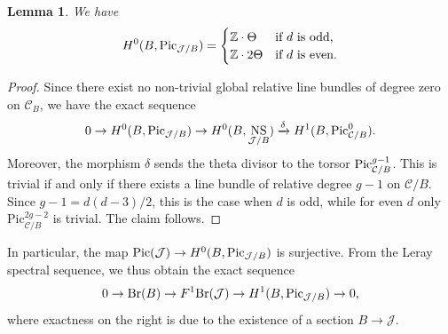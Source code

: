 \documentclass[11pt]{amsart}
\theoremstyle{plain}
\newtheorem{lem}[thm]{Lemma}
\theoremstyle{definition}
\theoremstyle{remark}
\DeclareMathOperator{\Br}{Br}
\newcommand{\Pic}{\mathop{\rm Pic}\nolimits}
\DeclareMathOperator{\NS}{NS}
\begin{document}
\begin{lem}\label{lem: desc picJ}
We have
$$H^0(B, \Pic_{\mathcal{J}/B}) = \begin{cases}
    \mathbb Z \cdot \Theta & \text{if } d \text{ is odd,} \\
    \mathbb Z \cdot 2 \Theta & \text{if } d \text{ is even}.
\end{cases}$$
\end{lem}
\begin{proof}
    Since there exist no non-trivial global relative line bundles of degree zero on $\mathcal C_B$, we have the exact sequence
    $$0 \to H^0(B, \Pic_{\mathcal{J}/B}) \to H^0(B,\NS_{\mathcal{J}/B}) \xrightarrow{\delta} H^1(B, \Pic^0_{\mathcal C / B}).$$
    Moreover, the morphism $\delta$ sends the theta divisor to the torsor $\Pic^{g-1}_{\mathcal C / B}$. This is trivial if and only if there exists a line bundle of relative degree $g-1$ on $\mathcal C / B$. Since $g - 1 = d(d-3)/2$, this is the case when $d$ is odd, while for even $d$ only $\mathrm{Pic}^{2g-2}_{\mathcal{C}/ B}$ is trivial. The claim follows.
\end{proof}

In particular, the map $\Pic(\mathcal{J}) \to H^0(B, \Pic_{\mathcal{J}/B})$ is surjective. From the Leray spectral sequence, we thus obtain the exact sequence
$$0 \to \Br(B) \to F^1\mathrm{Br}(\mathcal{J}) \to H^1(B, \Pic_{\mathcal{J}/B}) \to 0,$$
where exactness on the right is due to the existence of a section $B \to \mathcal{J}$.

\smallskip
\end{document}
